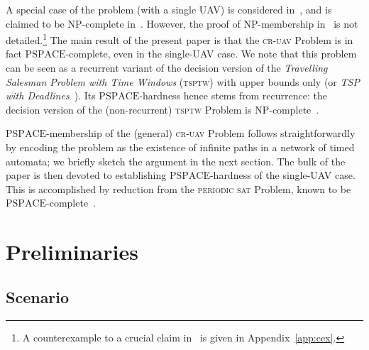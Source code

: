 \documentclass[envcountsame]{llncs}
\begin{document}
A special case of the problem (with a single UAV) is considered
in~\cite{Basilico2009, Basilico2012, Fargeas2013}, and is claimed to
be $\mathrm{NP}$-complete in~\cite{Basilico2012}.  However, the proof
of $\mathrm{NP}$-membership in~\cite{Basilico2012} is not
detailed.\footnote{A counterexample to a crucial claim
  in~\cite{Basilico2012} is given in Appendix~\ref{app:cex}.}  The
main result of the present paper is that the \textsc{cr-uav} Problem is
in fact $\mathrm{PSPACE}$-complete, even in the single-UAV case.
We note that this problem can be seen as a recurrent variant of the
decision version of the \emph{Travelling Salesman Problem with Time
  Windows} (\textsc{tsptw}) with upper bounds only (or \emph{TSP with Deadlines}~\cite{Bockenhauer2007}).  Its
$\mathrm{PSPACE}$-hardness hence stems from recurrence: the decision
version of the (non-recurrent) \textsc{tsptw} Problem is
$\mathrm{NP}$-complete~\cite{Savelsbergh1985}.



$\mathrm{PSPACE}$-membership of the (general) \textsc{cr-uav} Problem
follows straightforwardly by encoding the problem as the existence of
infinite paths in a network of timed automata; we briefly sketch the
argument in the next section. The bulk of the paper is then
devoted to establishing $\mathrm{PSPACE}$-hardness of the single-UAV
case. This is accomplished by reduction from the \textsc{periodic sat}
Problem, known to be $\mathrm{PSPACE}$-complete~\cite{Orlin1981}.

\section{Preliminaries}



\subsection{Scenario}
\end{document}
